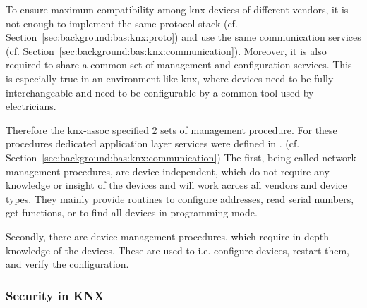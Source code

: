 To ensure maximum compatibility among \gls{knx} devices of different vendors, it is not enough to implement the same protocol stack (cf. Section~\ref{sec:background:bas:knx:proto}) and use the same communication services (cf. Section~\ref{sec:background:bas:knx:communication}).
Moreover, it is also required to share a common set of management and configuration services.
This is especially true in an environment like \gls{knx}, where devices need to be fully interchangeable and need to be configurable by a common tool used by electricians.

Therefore the \gls{knx-assoc} specified 2 sets of management procedure.
For these procedures dedicated application layer services were defined in \textcite{DIN_EN_50090-4-1}. (cf. Section~\ref{sec:background:bas:knx:communication})
The first, being called network management procedures, are device independent, which do not require any knowledge or insight of the devices and will work across all vendors and device types. \parencite[pp.~11~ff.]{DIN_EN_50090-7-1}
They mainly provide routines to configure addresses, read serial numbers, get functions, or to find all devices in programming mode.

Secondly, there are device management procedures, which require in depth knowledge of the devices. \parencite[pp.~30~ff.]{DIN_EN_50090-7-1}
These are used to i.e. configure devices, restart them, and verify the configuration.

\subsubsection{Security in KNX}
\label{sec:background:bas:knx:security}

